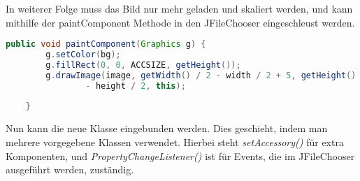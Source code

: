 In weiterer Folge muss das Bild nur mehr geladen und skaliert werden, und kann mithilfe der paintComponent Methode in den JFileChooser eingeschleust werden.
\begin{lstlisting}[language=JAVA]
public void paintComponent(Graphics g) {
		g.setColor(bg);
		g.fillRect(0, 0, ACCSIZE, getHeight());
		g.drawImage(image, getWidth() / 2 - width / 2 + 5, getHeight() / 2
				- height / 2, this);
		
	}
\end{lstlisting}

Nun kann die neue Klasse eingebunden werden. Dies geschieht, indem man mehrere vorgegebene Klassen verwendet. Hierbei steht \textit{setAccessory()} für extra Komponenten, und \textit{PropertyChangeListener()} ist für Events, die im JFileChooser ausgeführt werden, zuständig.